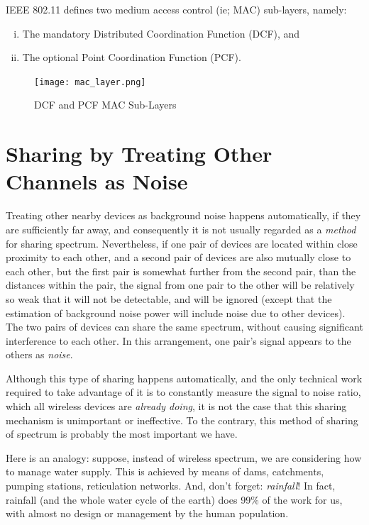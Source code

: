 IEEE 802.11 defines two medium access control (ie; MAC) sub-layers, namely:
\begin{enumerate}[(i)]
\item The mandatory Distributed Coordination Function (DCF), and
\item The optional Point Coordination Function (PCF).
\end{enumerate}

\begin{figure}
\centering
	\texttt{[image: mac\_layer.png]}
	\caption{DCF and PCF MAC Sub-Layers}
	\label{CSMA_CA}
\end{figure}


\section{Sharing by Treating Other Channels as Noise}

Treating other nearby devices as background noise happens automatically, if they are sufficiently far away,
and consequently it is not usually regarded as a {\em method} for sharing spectrum.
Nevertheless, if one pair of devices are located within close proximity to each other,
and a second pair of devices are also mutually close to each other, but the first pair
is somewhat further from the second pair, than the distances within the pair,
the signal from one pair to the other will be relatively so weak that it will not be detectable, and will
be ignored (except that the estimation of background noise power will include noise due to 
other devices). 
The two pairs of devices can share the same spectrum, without causing significant
interference to each other. In this arrangement, one pair's signal appears to the others 
as {\em noise}.

Although this type of sharing happens automatically, and the only technical work required
to take advantage of it is to constantly measure the signal to noise ratio, which all wireless
devices are {\em already doing}, it is not the case that this sharing mechanism is unimportant or
ineffective. To the contrary, this method of sharing of spectrum is probably the most important
we have.

Here is an analogy: suppose, instead of wireless spectrum, we are considering how to manage 
water supply. This is achieved by means of dams, catchments, pumping stations, reticulation networks.
And, don't forget: {\em rainfall}! In fact, rainfall (and the whole water cycle of the earth) 
does 99\% of the work for us, with almost no design or management by the human population.

